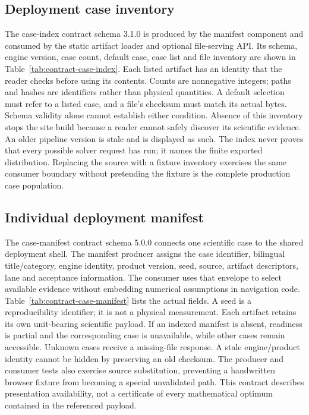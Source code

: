 \subsection{Deployment case inventory}\label{sec:contract-case-index}
The case-index contract schema 3.1.0 is produced by the manifest component and
consumed by the static artifact loader and optional file-serving API. Its schema,
engine version, case count, default case, case list and file inventory are shown
in Table~\ref{tab:contract-case-index}. Each listed artifact has an identity that
the reader checks before using its contents. Counts are nonnegative integers;
paths and hashes are identifiers rather than physical quantities. A default
selection must refer to a listed case, and a file's checksum must match its
actual bytes. Schema validity alone cannot establish either condition. Absence
of this inventory stops the site build because a reader cannot safely discover
its scientific evidence. An older pipeline version is stale and is displayed
as such. The index never proves that every possible solver request has run;
it names the finite exported distribution. Replacing the source with a fixture
inventory exercises the same consumer boundary without pretending the fixture
is the complete production case population.


\subsection{Individual deployment manifest}\label{sec:contract-case-manifest}
The case-manifest contract schema 5.0.0 connects one scientific case to the
shared deployment shell. The manifest producer assigns the case identifier,
bilingual title/category, engine identity, product version, seed, source,
artifact descriptors, lane and acceptance information. The consumer uses that
envelope to select available evidence without embedding numerical assumptions
in navigation code. Table~\ref{tab:contract-case-manifest} lists the actual
fields. A seed is a reproducibility identifier; it is not a physical measurement.
Each artifact retains its own unit-bearing scientific payload. If an indexed
manifest is absent, readiness is partial and the corresponding case is unavailable,
while other cases remain accessible. Unknown cases receive a missing-file response.
A stale engine/product identity cannot be hidden by preserving an old checksum.
The producer and consumer tests also exercise source substitution, preventing a
handwritten browser fixture from becoming a special unvalidated path. This
contract describes presentation availability, not a certificate of every
mathematical optimum contained in the referenced payload.


